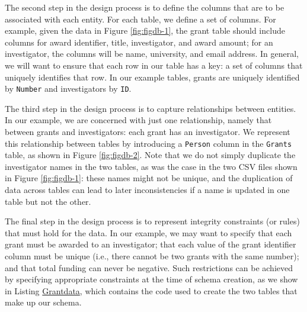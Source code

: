 \documentclass[]{krantz}
\begin{document}
The second step in the design process is to define the columns that are
to be associated with each entity. For each table, we define a set of
columns. For example, given the data in Figure \ref{fig:figdb-1}, the
grant table should include columns for award identifier, title,
investigator, and award amount; for an investigator, the columns will be
name, university, and email address. In general, we will want to ensure
that each row in our table has a key: a set of columns that uniquely
identifies that row. In our example tables, grants are uniquely
identified by \texttt{Number} and investigators by \texttt{ID}.

The third step in the design process is to capture relationships between
entities. In our example, we are concerned with just one relationship,
namely that between grants and investigators: each grant has an
investigator. We represent this relationship between tables by
introducing a \texttt{Person} column in the \texttt{Grants} table, as
shown in Figure \ref{fig:figdb-2}. Note that we do not simply duplicate
the investigator names in the two tables, as was the case in the two CSV
files shown in Figure \ref{fig:figdb-1}: these names might not be
unique, and the duplication of data across tables can lead to later
inconsistencies if a name is updated in one table but not the other.

The final step in the design process is to represent integrity
constraints (or rules) that must hold for the data. In our example, we
may want to specify that each grant must be awarded to an investigator;
that each value of the grant identifier column must be unique (i.e.,
there cannot be two grants with the same number); and that total funding
can never be negative. Such restrictions can be achieved by specifying
appropriate constraints at the time of schema creation, as we show in
Listing \protect\hyperlink{list:db1}{Grantdata}, which contains the code
used to create the two tables that make up our schema.
\end{document}
